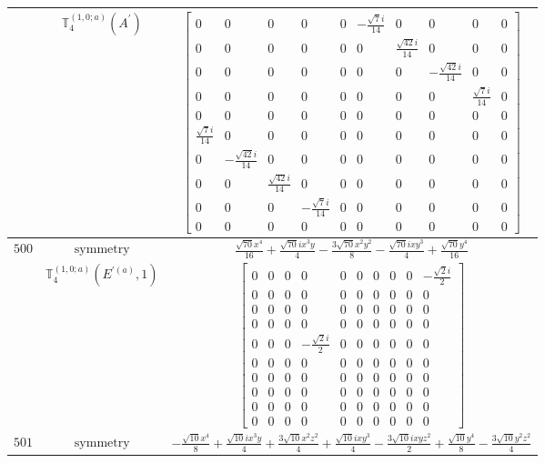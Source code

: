 \documentclass[fleqn,8pt,landscape]{jsarticle}
\begin{document}
\begin{longtable}{ccc}
$  $ & $ \mathbb{T}_{4}^{(1,0;a)}(A^{\prime}) $ & $ \begin{bmatrix} 0 & 0 & 0 & 0 & 0 & - \frac{\sqrt{7} i}{14} & 0 & 0 & 0 & 0 \\ 0 & 0 & 0 & 0 & 0 & 0 & \frac{\sqrt{42} i}{14} & 0 & 0 & 0 \\ 0 & 0 & 0 & 0 & 0 & 0 & 0 & - \frac{\sqrt{42} i}{14} & 0 & 0 \\ 0 & 0 & 0 & 0 & 0 & 0 & 0 & 0 & \frac{\sqrt{7} i}{14} & 0 \\ 0 & 0 & 0 & 0 & 0 & 0 & 0 & 0 & 0 & 0 \\ \frac{\sqrt{7} i}{14} & 0 & 0 & 0 & 0 & 0 & 0 & 0 & 0 & 0 \\ 0 & - \frac{\sqrt{42} i}{14} & 0 & 0 & 0 & 0 & 0 & 0 & 0 & 0 \\ 0 & 0 & \frac{\sqrt{42} i}{14} & 0 & 0 & 0 & 0 & 0 & 0 & 0 \\ 0 & 0 & 0 & - \frac{\sqrt{7} i}{14} & 0 & 0 & 0 & 0 & 0 & 0 \\ 0 & 0 & 0 & 0 & 0 & 0 & 0 & 0 & 0 & 0 \end{bmatrix} $ \\ \hline
$ 500 $ & $ \text{symmetry} $ & $ \frac{\sqrt{70} x^{4}}{16} + \frac{\sqrt{70} i x^{3} y}{4} - \frac{3 \sqrt{70} x^{2} y^{2}}{8} - \frac{\sqrt{70} i x y^{3}}{4} + \frac{\sqrt{70} y^{4}}{16} $ \\
$  $ & $ \mathbb{T}_{4}^{(1,0;a)}(E^{\prime(a)},1) $ & $ \begin{bmatrix} 0 & 0 & 0 & 0 & 0 & 0 & 0 & 0 & 0 & - \frac{\sqrt{2} i}{2} \\ 0 & 0 & 0 & 0 & 0 & 0 & 0 & 0 & 0 & 0 \\ 0 & 0 & 0 & 0 & 0 & 0 & 0 & 0 & 0 & 0 \\ 0 & 0 & 0 & 0 & 0 & 0 & 0 & 0 & 0 & 0 \\ 0 & 0 & 0 & - \frac{\sqrt{2} i}{2} & 0 & 0 & 0 & 0 & 0 & 0 \\ 0 & 0 & 0 & 0 & 0 & 0 & 0 & 0 & 0 & 0 \\ 0 & 0 & 0 & 0 & 0 & 0 & 0 & 0 & 0 & 0 \\ 0 & 0 & 0 & 0 & 0 & 0 & 0 & 0 & 0 & 0 \\ 0 & 0 & 0 & 0 & 0 & 0 & 0 & 0 & 0 & 0 \\ 0 & 0 & 0 & 0 & 0 & 0 & 0 & 0 & 0 & 0 \end{bmatrix} $ \\ \hline
$ 501 $ & $ \text{symmetry} $ & $ - \frac{\sqrt{10} x^{4}}{8} + \frac{\sqrt{10} i x^{3} y}{4} + \frac{3 \sqrt{10} x^{2} z^{2}}{4} + \frac{\sqrt{10} i x y^{3}}{4} - \frac{3 \sqrt{10} i x y z^{2}}{2} + \frac{\sqrt{10} y^{4}}{8} - \frac{3 \sqrt{10} y^{2} z^{2}}{4} $ \\

\end{longtable}
\end{document}
